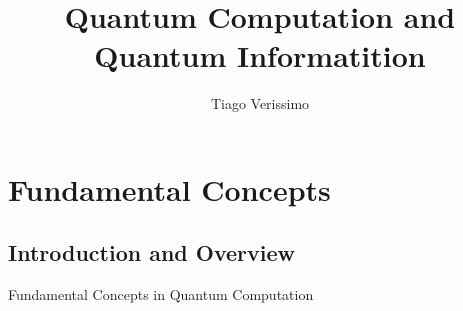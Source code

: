 \documentclass[hidelinks]{article}
\title{\textbf{Quantum Computation and Quantum Informatition}}
\author{Tiago Verissimo}
\begin{document}
\hypersetup{bookmarksnumbered=true}
\pagecolor{black}
\color{white}
\maketitle

\begin{Large}
\tableofcontents
\end{Large}
\pagebreak

\chapter{Fundamental Concepts}
\section{Introduction and Overview}

Fundamental Concepts in Quantum Computation
\end{document}
